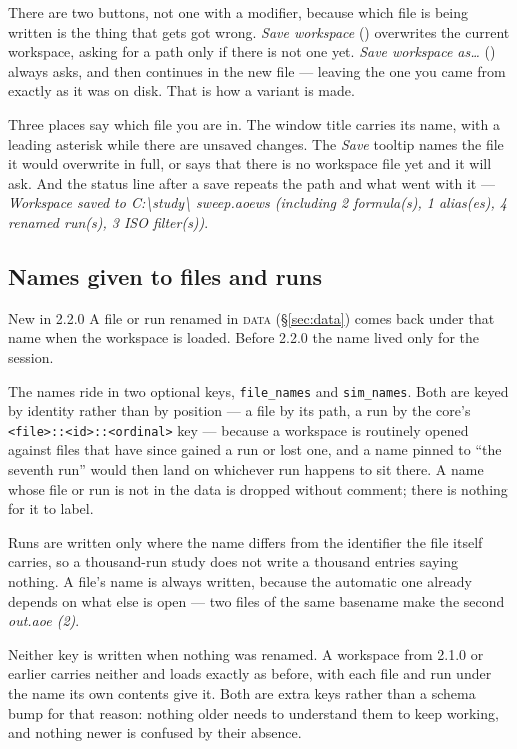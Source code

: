 \documentclass[11pt,a4paper,oneside]{report}
\newcommand{\appver}{2.2.0}
\newcommand{\code}[1]{\texttt{#1}}
\newcommand{\key}[1]{\textsf{\small\fbox{#1}}}
\newcommand{\tab}[1]{\textsc{#1}}
\begin{document}
There are two buttons, not one with a modifier, because which file is being
written is the thing that gets got wrong. \emph{Save workspace} (\key{Ctrl+S})
overwrites the current workspace, asking for a path only if there is not one yet.
\emph{Save workspace as\ldots} (\key{Ctrl+Shift+S}) always asks, and then
continues in the new file --- leaving the one you came from exactly as it was on
disk. That is how a variant is made.

Three places say which file you are in. The window title carries its name, with a
leading asterisk while there are unsaved changes. The \emph{Save} tooltip names
the file it would overwrite in full, or says that there is no workspace file yet
and it will ask. And the status line after a save repeats the path and what went
with it --- \emph{Workspace saved to C:\textbackslash study\textbackslash
sweep.aoews (including 2 formula(s), 1 alias(es), 4 renamed run(s), 3 ISO
filter(s))}.

\subsection{Names given to files and runs}

\begin{aoenew}{New in \appver}
A file or run renamed in \tab{data} (\S\ref{sec:data}) comes back under that name
when the workspace is loaded. Before \appver{} the name lived only for the
session.
\end{aoenew}

The names ride in two optional keys, \code{file\_names} and \code{sim\_names}.
Both are keyed by identity rather than by position --- a file by its path, a run
by the core's \code{<file>::<id>::<ordinal>} key --- because a workspace is
routinely opened against files that have since gained a run or lost one, and a
name pinned to ``the seventh run'' would then land on whichever run happens to sit
there. A name whose file or run is not in the data is dropped without comment;
there is nothing for it to label.

Runs are written only where the name differs from the identifier the file itself
carries, so a thousand-run study does not write a thousand entries saying
nothing. A file's name is always written, because the automatic one already
depends on what else is open --- two files of the same basename make the second
\emph{out.aoe (2)}.

Neither key is written when nothing was renamed. A workspace from 2.1.0 or
earlier carries neither and loads exactly as before, with each file and run under
the name its own contents give it. Both are extra keys rather than a schema bump
for that reason: nothing older needs to understand them to keep working, and
nothing newer is confused by their absence.
\end{document}
